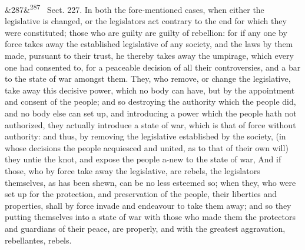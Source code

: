 \documentclass[12pt]{article}
\newcommand{\para}[1][]{\par\noindent\ifx&#1&\else\textsuperscript{\footnotesize #1}~\fi}
\begin{document}
\para[287] Sect. 227. In both the fore-mentioned cases, when either the legislative is changed, or the legislators act contrary to the end for which they were constituted; those who are guilty are guilty of rebellion: for if any one by force takes away the established legislative of any society, and the laws by them made, pursuant to their trust, he thereby takes away the umpirage, which every one had consented to, for a peaceable decision of all their controversies, and a bar to the state of war amongst them. They, who remove, or change the legislative, take away this decisive power, which no body can have, but by the appointment and consent of the people; and so destroying the authority which the people did, and no body else can set up, and introducing a power which the people hath not authorized, they actually introduce a state of war, which is that of force without authority: and thus, by removing the legislative established by the society, (in whose decisions the people acquiesced and united, as to that of their own will) they untie the knot, and expose the people a-new to the state of war, And if those, who by force take away the legislative, are rebels, the legislators themselves, as has been shewn, can be no less esteemed so; when they, who were set up for the protection, and preservation of the people, their liberties and properties, shall by force invade and endeavour to take them away; and so they putting themselves into a state of war with those who made them the protectors and guardians of their peace, are properly, and with the greatest aggravation, rebellantes, rebels.
\end{document}
